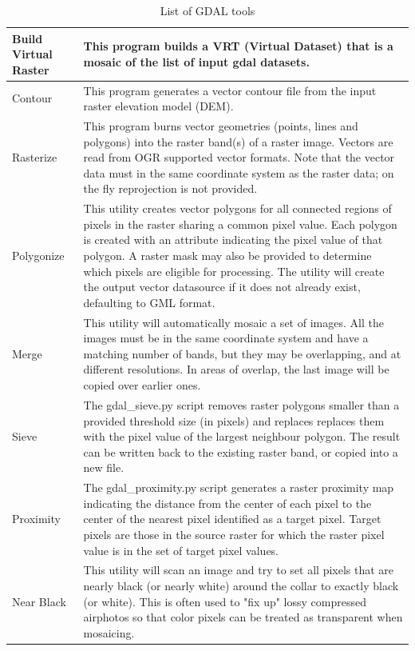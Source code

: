 {\setlength{\extrarowheight}{15pt}
\begin{longtable}{|p{3cm}|p{13cm}|}
\caption{List of GDAL tools}\label{tab:gdaltools} \\
\hline
Build Virtual Raster & This program builds a VRT (Virtual Dataset) that is a mosaic of the list of input gdal datasets. \\
\hline Contour & This program generates a vector contour file from the input raster elevation model (DEM).\\
\hline Rasterize &  This program burns vector geometries (points, lines and polygons) into the raster band(s) of a raster image. Vectors are read from OGR supported vector formats. Note that the vector data must in the same coordinate system as the raster data; on the fly reprojection is not provided.\\
\hline Polygonize & This utility creates vector polygons for all connected regions of pixels in the raster sharing a common pixel value. Each polygon is created with an attribute indicating the pixel value of that polygon. A raster mask may also be provided to determine which pixels are eligible for processing.
The utility will create the output vector datasource if it does not already exist, defaulting to GML format.\\
\hline Merge &  This utility will automatically mosaic a set of images. All the images must be in the same coordinate system and have a matching number of bands, but they may be overlapping, and at different resolutions. In areas of overlap, the last image will be copied over earlier ones. \\
\hline Sieve & The gdal\_sieve.py script removes raster polygons smaller than a provided threshold size (in pixels) and replaces replaces them with the pixel value of the largest neighbour polygon. The result can be written back to the existing raster band, or copied into a new file.\\
\hline Proximity & The gdal\_proximity.py script generates a raster proximity map indicating the distance from the center of each pixel to the center of the nearest pixel identified as a target pixel. Target pixels are those in the source raster for which the raster pixel value is in the set of target pixel values.\\
\hline Near Black & This utility will scan an image and try to set all pixels that are nearly black (or nearly white) around the collar to exactly black (or white). This is often used to "fix up" lossy compressed airphotos so that color pixels can be treated as transparent when mosaicing.\\

\end{longtable}}
